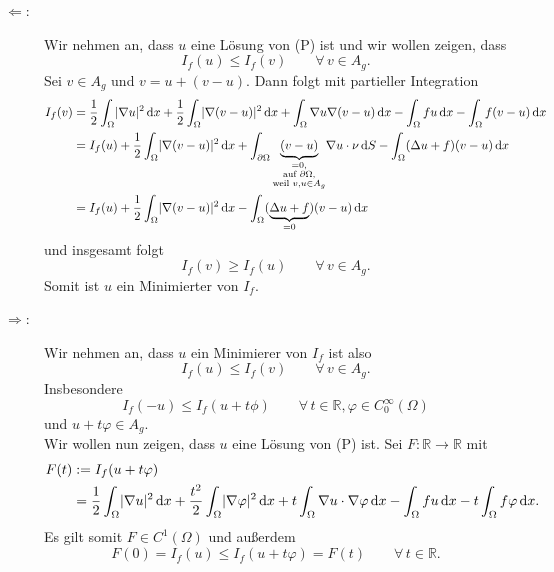 \begin{beweis}
	\begin{description}
		\item[$\Leftarrow $:] Wir nehmen an, dass $u$ eine Lösung von (P) ist und wir wollen zeigen, dass 
		\[
			I_f(u) \leq I_f(v) \qquad \forall\,  v \in A_g .
		\] 
		Sei $v \in A_g$ und $v = u + (v-u)$. Dann folgt mit partieller Integration
		\begin{align*}
			I_f(v) &= \frac{1}{2} \int_{\Omega}^{} \lvert \nabla  u\rvert^2 \,\mathrm{d}x + \frac{1}{2} \int_{ \Omega}^{} \lvert  \nabla (v-u)\rvert^2 \,\mathrm{d}x 
			+ \int_{ \Omega}^{}  \nabla u  \nabla (v-u) \,\mathrm{d}x - \int_{\Omega}^{}fu \,\mathrm{d}x - \int_{\Omega}^{}f(v-u) \,\mathrm{d}x \\
			&= I_f(u) + \frac{1}{2} \int_{\Omega}^{} \lvert  \nabla (v-u)\rvert^2 \,\mathrm{d}x 
			+ \int_{\partial \Omega}^{} \underset{\substack{=0, \\ \text{auf } \partial \Omega, \\\text{weil }v,u \in A_g}}{\underbrace{(v-u)}} 
			\nabla u \cdot \nu \,\mathrm{d}S - \int_{\Omega}^{}(\Delta u +f)(v-u) \,\mathrm{d}x \\
			&= I_f(u) + \frac{1}{2} \int_{\Omega}^{} \lvert  \nabla (v-u)\rvert^2 \,\mathrm{d}x - \int_{\Omega}^{} (\underset{=0}{\underbrace{ \Delta u + f}})(v-u) \,\mathrm{d}x
		\end{align*}
		und insgesamt folgt 
		\[
			I_f(v) \geq I_f(u) \qquad \forall\, v \in A_g.
		\]
		Somit ist $u$ ein Minimierter von $I_f$.
		\item[$\Rightarrow $:] Wir nehmen an, dass $u$ ein Minimierer von $I_f$ ist also 
		\[
			I_f(u) \leq I_f(v) \qquad \forall\, v \in A_g.
		\]
		Insbesondere 
		\[
			I_f(-u) \leq I_f(u + t \phi) \qquad \forall\,  t \in \mathbb{R}, \varphi \in C^{\infty}_0(\Omega)
		\]
		und $u + t \varphi \in A_g$. \\
		Wir wollen nun zeigen, dass $u$ eine Lösung von (P) ist. Sei $F: \mathbb{R} \to \mathbb{R}$ mit
		\begin{align*}
			F(t) &:= I_f(u + t \varphi) \\ &= \frac{1}{2} \int_{\Omega}^{} \lvert  \nabla u\rvert^2 \,\mathrm{d}x 
			+ \frac{t^2}{2} \int_{\Omega} \lvert \nabla \varphi\rvert^2 \,\mathrm{d}x + t \int_{\Omega}^{}  \nabla u \cdot  \nabla \varphi \,\mathrm{d}x
			- \int_{\Omega}^{} fu \,\mathrm{d}x - t \int_{\Omega}^{}f \varphi \,\mathrm{d}x.
		\end{align*}
		Es gilt somit $F \in C^1(\Omega)$ und außerdem
		\[
			F(0) = I_f(u) \leq I_f(u + t \varphi) = F(t) \qquad \forall\, t \in \mathbb{R}.
\]
\end{description}
\end{beweis}
